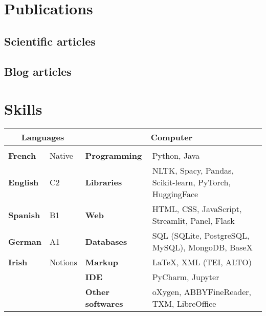 \documentclass[11pt,a4paper,sans]{moderncv} %
\begin{document}

\section{Publications}
\subsection{Scientific articles}
\begin{refsection}
    \nocite{*}
    \printbibliography[heading=none]
\end{refsection}

\subsection{Blog articles}
\begin{refsection}
    \nocite{*}
    \printbibliography[heading=none]
\end{refsection}


\section{Skills}
    \small
    \setlength{\tabcolsep}{5pt}
    \begin{tabular}{ll|ll}
    \multicolumn{2}{c}{\textbf{Languages}}   & \multicolumn{2}{c}{\textbf{Computer}}                                             \\
    \hline \\
    \textbf{French}  & Native & \textbf{Programming}       & Python, Java                                            \\
    \textbf{English}   & C2                & \textbf{Libraries}          & NLTK, Spacy, Pandas, Scikit-learn, PyTorch, HuggingFace \\
    \textbf{Spanish}  & B1                & \textbf{Web}                 & HTML, CSS, JavaScript, Streamlit, Panel, Flask          \\
    \textbf{German}  & A1                & \textbf{Databases}    & SQL (SQLite, PostgreSQL, MySQL), MongoDB, BaseX         \\
    \textbf{Irish} & Notions           & \textbf{Markup} & \LaTeX, XML (TEI, ALTO)                  \\
              &                   & \textbf{IDE}                 & PyCharm, Jupyter                                        \\
              &                   & \textbf{Other softwares}    & oXygen, ABBYFineReader, TXM, LibreOffice               
    \end{tabular}
\end{document}
